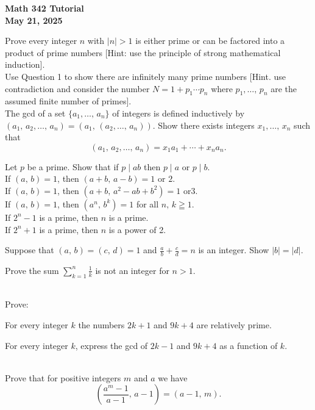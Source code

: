 \documentclass[a4paper,11pt]{article}
\theoremstyle{mythm}
\theoremstyle{mydef}
\newcommand{\abs}[1]{\left\vert #1 \right\vert}
\begin{document}
\begin{center}
  {\Large\bfseries Math 342 Tutorial} \\
  {\normalsize\bf May 21, 2025}
\end{center}

 Prove every integer $n$ with $\abs{n}>1$ is either
prime or can be factored into a product of prime numbers [Hint: use the
principle of strong mathematical induction]. \\

 Use Question 1 to show there are infinitely many
prime numbers [Hint. use contradiction and consider the number $N=1+p_1 \cdots
p_n$ where $p_1,\dots,\,p_n$ are the assumed finite number of primes]. \\

 The gcd of a set $\{a_1,\dots,\,a_n\}$ of integers is
defined inductively by $(a_1,\,a_2,\dots,\,a_n)=(a_1,\,(a_2,\dots,\,a_n))$. Show
there exists integers $x_1,\dots,\,x_n$ such that
\[
  (a_1,\,a_2,\dots,\,a_n) = x_1a_1 + \cdots + x_na_n.
\]

 Let $p$ be a prime. Show that if $p \mid ab$ then $p
\mid a$ or $p \mid b$. \\

 If $(a,\,b)=1$, then $(a+b,\,a-b)=1\text{ or }2$. \\

 If $(a,\,b)=1$, then $(a+b,\,a^2-ab+b^2)=1\text{ or
}3$. \\

 If $(a,\,b)=1$, then $(a^n,\,b^k)=1$ for all $n,\,k
\geqq 1$. \\

 If $2^n-1$ is a prime, then $n$ is a prime. \\

 If $2^n+1$ is a prime, then $n$ is a power of 2. \\

\begin{enumerate*}[{\bf (a)}]
\item Suppose that $(a,\,b) = (c,\,d) = 1$ and $\frac{a}{b}+\frac{c}{d}=n$ is an
  integer. Show $\abs{b}=\abs{d}$.
\item Prove the sum $\sum_{k=1}^n\frac{1}{k}$ is not an integer for $n > 1$.
\end{enumerate*} \\

 Prove:
\begin{enumerate*}[{\bf (a)}]
\item For every integer $k$ the numbers $2k+1$ and $9k+4$ are relatively prime.
\item For every integer $k$, express the gcd of $2k-1$ and $9k+4$ as a function
  of $k$.
\end{enumerate*} \\

 Prove that for positive integers $m$ and $a$ we have
\[
  \left(
    \frac{a^m-1}{a-1},\,a-1
  \right)
  = (a-1,\,m).
\]
\end{document}
